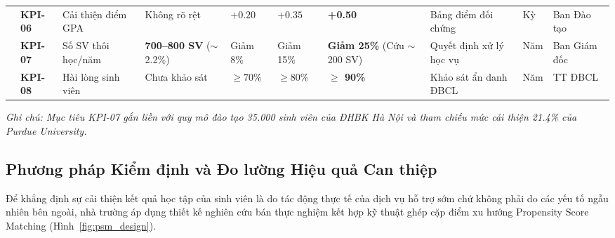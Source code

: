 \begin{table}[htbp]
\begin{tabularx}{\textwidth}{|C{1.2cm}|C{0.95cm}|L{2.2cm}|L{1.8cm}|C{0.9cm}|C{0.9cm}|C{1.1cm}|Y|C{0.8cm}|L{1.7cm}|}
& \textbf{KPI-06} & Cải thiện điểm GPA & Không rõ rệt & $+0.20$ & $+0.35$ & \textbf{+0.50} & Bảng điểm đối chứng & Kỳ & Ban Đào tạo \\
& \textbf{KPI-07} & Số SV thôi học/năm & \textbf{700--800 SV} ($\sim$2.2\%) & Giảm 8\% & Giảm 15\% & \textbf{Giảm 25\%} (Cứu $\sim$200 SV) & Quyết định xử lý học vụ & Năm & Ban Giám đốc \\
& \textbf{KPI-08} & Hài lòng sinh viên & Chưa khảo sát & $\ge 70\%$ & $\ge 80\%$ & \textbf{$\ge$ 90\%} & Khảo sát ẩn danh ĐBCL & Năm & TT ĐBCL \\
\hline
\end{tabularx}
\begin{flushleft}
\textit{\fontsize{7.5}{9}\selectfont Ghi chú: Mục tiêu KPI-07 gắn liền với quy mô đào tạo 35.000 sinh viên của ĐHBK Hà Nội và tham chiếu mức cải thiện 21.4\% của Purdue University.}
\end{flushleft}
\end{table}

\subsection{Phương pháp Kiểm định và Đo lường Hiệu quả Can thiệp}
Để khẳng định sự cải thiện kết quả học tập của sinh viên là do tác động thực tế của dịch vụ hỗ trợ sớm chứ không phải do các yếu tố ngẫu nhiên bên ngoài, nhà trường áp dụng thiết kế nghiên cứu bán thực nghiệm kết hợp kỹ thuật ghép cặp điểm xu hướng Propensity Score Matching (Hình~\ref{fig:psm_design}).

